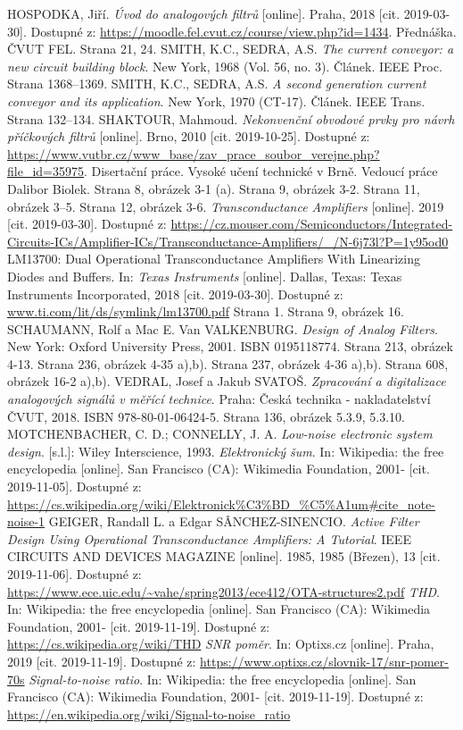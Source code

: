 \begin{thebibliography}{999}
HOSPODKA, Jiří. \textit{Úvod do analogových filtrů} [online]. Praha, 2018 [cit. 2019-03-30]. Dostupné z: \url{https://moodle.fel.cvut.cz/course/view.php?id=1434}. Přednáška. ČVUT FEL. Strana 21, 24.
SMITH, K.C., SEDRA, A.S. \textit{The current conveyor: a new circuit building block}. New York, 1968 (Vol. 56, no. 3). Článek. IEEE Proc. Strana 1368--1369.
SMITH, K.C., SEDRA, A.S. \textit{A second generation current conveyor and its application}. New York, 1970 (CT-17). Článek. IEEE Trans. Strana 132--134.
SHAKTOUR, Mahmoud. \textit{Nekonvenční obvodové prvky pro návrh příčkových filtrů} [online]. Brno, 2010 [cit. 2019-10-25]. Dostupné z: \url{https://www.vutbr.cz/www_base/zav_prace_soubor_verejne.php?file_id=35975}. Disertační práce. Vysoké učení technické v Brně. Vedoucí práce Dalibor Biolek. Strana 8, obrázek 3-1 (a). Strana 9, obrázek 3-2. Strana 11, obrázek 3--5. Strana 12, obrázek 3-6.
\textit{Transconductance Amplifiers} [online]. 2019 [cit. 2019-03-30]. Dostupné z: \url{https://cz.mouser.com/Semiconductors/Integrated-Circuits-ICs/Amplifier-ICs/Transconductance-Amplifiers/_/N-6j73l?P=1y95od0}
LM13700: Dual Operational Transconductance Amplifiers With Linearizing Diodes and Buffers. In: \textit{Texas Instruments} [online]. Dallas, Texas: Texas Instruments Incorporated, 2018 [cit. 2019-03-30]. Dostupné z: \url{www.ti.com/lit/ds/symlink/lm13700.pdf} Strana 1. Strana 9, obrázek 16.
SCHAUMANN, Rolf a Mac E. Van VALKENBURG. \textit{Design of Analog Filters}. New York: Oxford University Press, 2001. ISBN 0195118774. Strana 213, obrázek 4-13. Strana 236, obrázek 4-35 a),b). Strana 237, obrázek 4-36 a),b). Strana 608, obrázek 16-2 a),b).
\renewcommand{\headrulewidth}{0pt}
\fancyhf{}
VEDRAL, Josef a Jakub SVATOŠ. \textit{Zpracování a digitalizace analogových signálů v měřící technice}. Praha: Česká technika - nakladatelství ČVUT, 2018. ISBN 978-80-01-06424-5. Strana 136, obrázek 5.3.9, 5.3.10.
MOTCHENBACHER, C. D.; CONNELLY, J. A. \textit{Low-noise electronic system design}. [s.l.]: Wiley Interscience, 1993.
\textit{Elektronický šum}. In: Wikipedia: the free encyclopedia [online]. San Francisco (CA): Wikimedia Foundation, 2001- [cit. 2019-11-05]. Dostupné z: \url{https://cs.wikipedia.org/wiki/Elektronick%C3%BD_%C5%A1um#cite_note-noise-1}
GEIGER, Randall L. a Edgar SÂNCHEZ-SINENCIO. \textit{Active Filter Design Using Operational Transconductance Amplifiers: A Tutorial}. IEEE CIRCUITS AND DEVICES MAGAZINE [online]. 1985, 1985 (Březen), 13 [cit. 2019-11-06]. Dostupné z: \url{https://www.ece.uic.edu/~vahe/spring2013/ece412/OTA-structures2.pdf}
\textit{THD}. In: Wikipedia: the free encyclopedia [online]. San Francisco (CA): Wikimedia Foundation, 2001- [cit. 2019-11-19]. Dostupné z: \url{https://cs.wikipedia.org/wiki/THD}
\textit{SNR poměr}. In: Optixs.cz [online]. Praha, 2019 [cit. 2019-11-19]. Dostupné z: \url{https://www.optixs.cz/slovnik-17/snr-pomer-70s}
\textit{Signal-to-noise ratio}. In: Wikipedia: the free encyclopedia [online]. San Francisco (CA): Wikimedia Foundation, 2001- [cit. 2019-11-19]. Dostupné z: \url{https://en.wikipedia.org/wiki/Signal-to-noise_ratio}
\end{thebibliography}